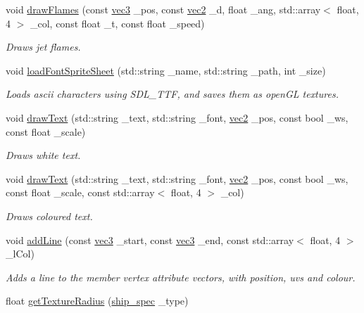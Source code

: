 \begin{DoxyCompactItemize}
\item 
void \hyperlink{classrenderer__ngl_adf24e3a17ffbf93af089722e815a8f66}{draw\-Flames} (const \hyperlink{structvec3}{vec3} \-\_\-pos, const \hyperlink{structvec2}{vec2} \-\_\-d, float \-\_\-ang, std\-::array$<$ float, 4 $>$ \-\_\-col, const float \-\_\-t, const float \-\_\-speed)
\begin{DoxyCompactList}\small\item\em Draws jet flames. \end{DoxyCompactList}\item 
void \hyperlink{classrenderer__ngl_a856a772090764eb794ad20425ecfed4d}{load\-Font\-Sprite\-Sheet} (std\-::string \-\_\-name, std\-::string \-\_\-path, int \-\_\-size)
\begin{DoxyCompactList}\small\item\em Loads ascii characters using S\-D\-L\-\_\-\-T\-T\-F, and saves them as open\-G\-L textures. \end{DoxyCompactList}\item 
void \hyperlink{classrenderer__ngl_ac5f5f689c79ce54fa88d6c81ed2b733b}{draw\-Text} (std\-::string \-\_\-text, std\-::string \-\_\-font, \hyperlink{structvec2}{vec2} \-\_\-pos, const bool \-\_\-ws, const float \-\_\-scale)
\begin{DoxyCompactList}\small\item\em Draws white text. \end{DoxyCompactList}\item 
void \hyperlink{classrenderer__ngl_a379a4c77b8a21e60774ce9034fcd9c1b}{draw\-Text} (std\-::string \-\_\-text, std\-::string \-\_\-font, \hyperlink{structvec2}{vec2} \-\_\-pos, const bool \-\_\-ws, const float \-\_\-scale, const std\-::array$<$ float, 4 $>$ \-\_\-col)
\begin{DoxyCompactList}\small\item\em Draws coloured text. \end{DoxyCompactList}\item 
void \hyperlink{classrenderer__ngl_a5fbc227d0398f6a8dbf5690e75c319bc}{add\-Line} (const \hyperlink{structvec3}{vec3} \-\_\-start, const \hyperlink{structvec3}{vec3} \-\_\-end, const std\-::array$<$ float, 4 $>$ \-\_\-l\-Col)
\begin{DoxyCompactList}\small\item\em Adds a line to the member vertex attribute vectors, with position, uvs and colour. \end{DoxyCompactList}\item 
float \hyperlink{classrenderer__ngl_a5523a0b8263680dc91f74e2492fe0f8d}{get\-Texture\-Radius} (\hyperlink{ship_8hpp_af74a63841701826d661cb9809aaf7092}{ship\-\_\-spec} \-\_\-type)

\end{DoxyCompactItemize}
